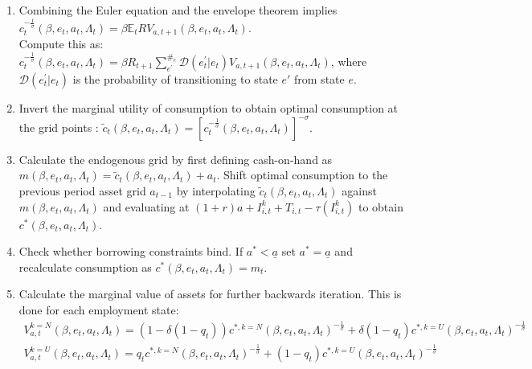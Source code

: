 \begin{enumerate}
    \item Combining the Euler equation and the envelope theorem implies $c_{t}^{-\frac{1}{\sigma}}\left(\beta,e_{t},a_{t},\Lambda_{t}\right)=\beta\mathbb{E}_{t}RV_{a,t+1}\left(\beta,e_{t},a_{t},\Lambda_{t}\right)$.\\ Compute this as: $c_{t}^{-\frac{1}{\sigma}}\left(\beta,e_{t},a_{t},\Lambda_{t}\right)=\beta R_{t+1}\sum_{e^{'}}^{\#_{e}}\mathcal{D}\left(e_{t}^{'}\left|e_{t}\right.\right)V_{a,t+1}\left(\beta,e_{t},a_{t},\Lambda_{t}\right)$, where $\mathcal{D}\left(e_{t}^{'}\left|e_{t}\right.\right)$ is the probability of transitioning to state $e'$ from state $e$. 
    
    \item Invert the marginal utility of consumption to obtain optimal consumption at the grid points : $\tilde{c}_{t}\left(\beta,e_{t},a_{t},\Lambda_{t}\right)=\left[c_{t}^{-\frac{1}{\sigma}}\left(\beta,e_{t},a_{t},\Lambda_{t}\right)\right]^{-\sigma}$.
    \item Calculate the endogenous grid by first defining cash-on-hand as \\ $m\left(\beta,e_{t},a_{t},\Lambda_{t}\right)=\tilde{c}_{t}\left(\beta,e_{t},a_{t},\Lambda_{t}\right) +a_{t}$. Shift optimal consumption to the previous period asset grid $a_{t-1}$ by interpolating $\tilde{c}_{t}\left(\beta,e_{t},a_{t},\Lambda_{t}\right)$ against $m\left(\beta,e_{t},a_{t},\Lambda_{t}\right)$ and evaluating at $\left(1+r\right)a+I_{i,t}^{k}+T_{i,t}-\tau\left(I_{i,t}^{k}\right)$ to obtain $c^{*}\left(\beta,e_{t},a_{t},\Lambda_{t}\right)$. 
    
    \item Check whether borrowing constraints bind. If $a^{*}<\underline{a}$ set $a^{*}=\underline{a}$ and recalculate consumption as $c^{*}\left(\beta,e_{t},a_{t},\Lambda_{t}\right)=m_{t}$. 
    
    \item Calculate the marginal value of assets for further backwards iteration. This is done for each employment state:
    \begin{gather*}
        V_{a,t}^{k=N}\left(\beta,e_{t},a_{t},\Lambda_{t}\right)=\left(1-\delta\left(1-q_{t}\right)\right)c^{*,k=N}\left(\beta,e_{t},a_{t},\Lambda_{t}\right)^{-\frac{1}{\sigma}}+\delta\left(1-q_{t}\right)c^{*,k=U}\left(\beta,e_{t},a_{t},\Lambda_{t}\right)^{-\frac{1}{\sigma}}\\
        V_{a,t}^{k=U}\left(\beta,e_{t},a_{t},\Lambda_{t}\right)=q_{t}c^{*,k=N}\left(\beta,e_{t},a_{t},\Lambda_{t}\right)^{-\frac{1}{\sigma}}+\left(1-q_{t}\right)c^{*,k=U}\left(\beta,e_{t},a_{t},\Lambda_{t}\right)^{-\frac{1}{\sigma}}
    \end{gather*}

\end{enumerate}

